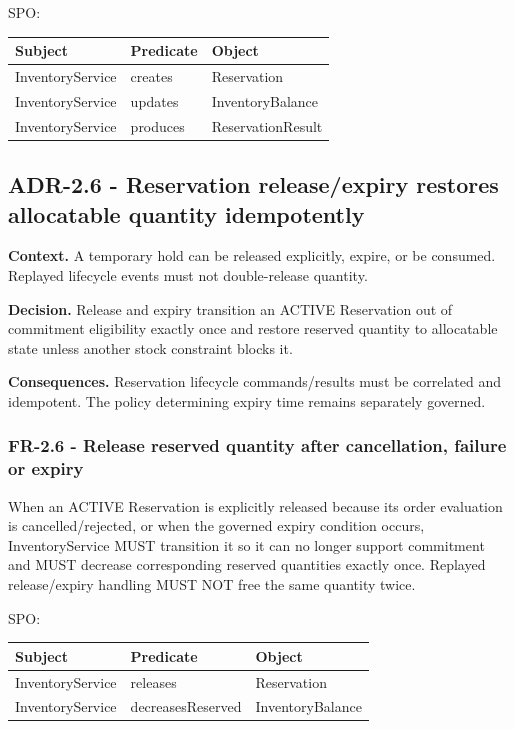 \documentclass[
  10pt,
]{article}
\begin{document}
SPO:

\begin{longtable}[]{@{}lll@{}}
\toprule\noalign{}
Subject & Predicate & Object \\
\midrule\noalign{}
\endhead
\bottomrule\noalign{}
\endlastfoot
InventoryService & creates & Reservation \\
InventoryService & updates & InventoryBalance \\
InventoryService & produces & ReservationResult \\
\end{longtable}

\subsection{ADR-2.6 - Reservation release/expiry restores allocatable
quantity
idempotently}\label{adr-26---reservation-releaseexpiry-restores-allocatable-quantity-idempotently}

\textbf{Context.} A temporary hold can be released explicitly, expire,
or be consumed. Replayed lifecycle events must not double-release
quantity.

\textbf{Decision.} Release and expiry transition an ACTIVE Reservation
out of commitment eligibility exactly once and restore reserved quantity
to allocatable state unless another stock constraint blocks it.

\textbf{Consequences.} Reservation lifecycle commands/results must be
correlated and idempotent. The policy determining expiry time remains
separately governed.

\subsubsection{FR-2.6 - Release reserved quantity after cancellation,
failure or
expiry}\label{fr-26---release-reserved-quantity-after-cancellation-failure-or-expiry}

When an ACTIVE Reservation is explicitly released because its order
evaluation is cancelled/rejected, or when the governed expiry condition
occurs, InventoryService MUST transition it so it can no longer support
commitment and MUST decrease corresponding reserved quantities exactly
once. Replayed release/expiry handling MUST NOT free the same quantity
twice.

SPO:

\begin{longtable}[]{@{}lll@{}}
\toprule\noalign{}
Subject & Predicate & Object \\
\midrule\noalign{}
\endhead
\bottomrule\noalign{}
\endlastfoot
InventoryService & releases & Reservation \\
InventoryService & decreasesReserved & InventoryBalance \\
\end{longtable}
\end{document}
